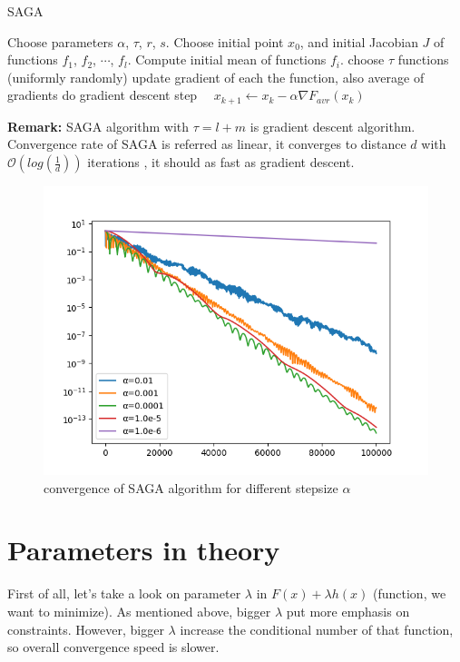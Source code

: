 \documentclass[11pt]{book}
\begin{document}
\begin{algorithm}[H]
	\caption{SAGA \cite{SAGA}}
	\label{alg:saga}
	\begin{algorithmic}[1]
		\State Choose parameters $\alpha$, $\tau$, $r$, $s$.
		\State Choose initial point $x_0$, and initial Jacobian $J$ of functions $f_1$, $f_2$, $\cdots$, $f_l$.
		\State Compute initial mean of functions $f_i$.
		\State choose $\tau$ functions (uniformly randomly)
		\State update gradient of each the function, also average of gradients
		\State do gradient descent step $\quad x_{k+1} \leftarrow x_k - \alpha\nabla F_{avr}(x_k) \quad$
		\EndFor
	\end{algorithmic}
\end{algorithm}

\textbf{Remark:} SAGA algorithm with $\tau=l+m$ is gradient descent algorithm.\\

Convergence rate of SAGA is referred as linear, it converges to distance $d$ with $\mathcal{O}(log(\frac{1}{d}))$ iterations \cite{SAGA}, it should as fast as gradient descent.\\

\begin{figure}[H]
	\centering
	\includegraphics[width=0.7\linewidth]{saga_convergence.png}
	\caption{convergence of SAGA algorithm for different stepsize $\alpha$}
	\label{fig:saga}
\end{figure}

\section{Parameters in theory}

First of all, let's take a look on parameter $\lambda$ in $F(x)+\lambda h(x)$ (function, we want to minimize). As mentioned above, bigger $\lambda$ put more emphasis on constraints. However, bigger $\lambda$ increase the conditional number of that function, so overall convergence speed is slower.\\
\end{document}
